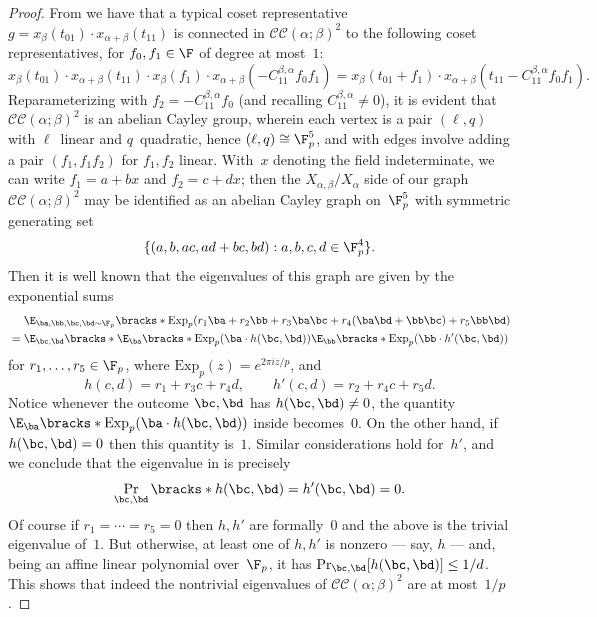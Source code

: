 \documentclass[11pt]{article}
\newcommand{\CC}[2]{\mathcal{C}\mathcal{C}(#1;#2)}
\newcommand{\Exp}{{\mathrm{Exp}}}
\begin{document}
\begin{proof}
    From  we have that a typical coset representative 
    $
        g = x_\beta(t_{01})\cdot x_{\alpha+\beta}(t_{11})
    $
    is connected in $\CC{\alpha}{\beta}^2$ to the following coset representatives, for $f_0, f_1 \in \F$ of degree at most~$1$:
    \[
        x_\beta(t_{01})\cdot x_{\alpha+\beta}(t_{11})\cdot x_{\beta}(f_1) \cdot x_{\alpha+\beta}(-C_{11}^{\beta,\alpha} f_0f_1) = x_{\beta}(t_{01}+f_1) \cdot x_{\alpha+\beta}(t_{11} - C_{11}^{\beta,\alpha} f_0f_1).
    \]
    Reparameterizing with $f_2 = -C_{11}^{\beta,\alpha}f_0$ (and recalling $C_{11}^{\beta,\alpha} \neq 0$), it is evident that $\CC{\alpha}{\beta}^2$ is an abelian Cayley group, wherein each vertex is a pair $(\ell,q) $ with $\ell$~linear and $q$~quadratic, hence $(\ell,q) \cong \F_p^5$, and with edges involve adding a pair $(f_1,f_1f_2)$ for $f_1,f_2$ linear. With~$x$ denoting the field indeterminate, we can write $f_1 = a+bx$ and $f_2 = c + dx$; then the $X_{\alpha,\beta}/X_\alpha$ side of our graph~$\CC{\alpha}{\beta}^2$ may be identified as an abelian Cayley graph on~$\F_p^5$ with symmetric generating set 
    \[
        \{(a,b,ac,ad+bc,bd) : a,b,c,d \in \F_p^4\}.
    \]
    Then it is well known that the eigenvalues of this graph are given by the exponential sums
    \begin{align}
        &\mathrel{\phantom{=}} \E_{\ba,\bb,\bc,\bd \sim \F_p}\bracks*{\Exp_p(r_1\ba + r_2 \bb + r_3\ba\bc + r_4(\ba\bd+\bb\bc) + r_5\bb\bd)}  \nonumber \\
        &= \E_{\bc,\bd}\bracks*{
            \E_{\ba}\bracks*{\Exp_p(\ba \cdot h(\bc,\bd))}
            \E_{\bb}\bracks*{\Exp_p(\bb \cdot h'(\bc,\bd))}} \label{yo}
    \end{align}
    for $r_1, \dots, r_5 \in \F_p$, where $\Exp_p(z) = e^{2\pi i z/p}$, and
    \[
        h(c,d) = r_1 + r_3c + r_4d, \qquad h'(c,d) = r_2 + r_4c + r_5d.
    \]
    Notice whenever the outcome $\bc,\bd$ has $h(\bc,\bd) \neq 0$, the  quantity $\E_{\ba}\bracks*{\Exp_p(\ba \cdot h(\bc,\bd))}$ inside  becomes~$0$.  On the other hand, if $h(\bc,\bd) = 0$ then this quantity is~$1$.  Similar considerations hold for~$h'$, and we conclude that the eigenvalue in  is precisely
    \[
        \Pr_{\bc,\bd}\bracks*{h(\bc,\bd) = h'(\bc,\bd) = 0}.
    \]
    Of course if $r_1 = \cdots = r_5 = 0$ then $h,h'$ are formally~$0$ and the above is the trivial eigenvalue of~$1$. 
    But otherwise, at least one of $h,h'$ is nonzero --- say, $h$ --- and, being an  affine linear polynomial over~$\F_p$, it has $\Pr_{\bc,\bd}[h(\bc,\bd)] \leq 1/d$.  This shows that indeed the nontrivial eigenvalues of $\CC{\alpha}{\beta}^2$ are at most~$1/p$.


\end{proof}
\end{document}
